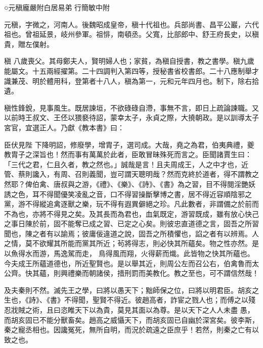 
\begin{pinyinscope}

 ○元稹龐嚴附白居易弟
 行簡敏中附



 元稹，字微之，河南人。後魏昭成皇帝，稹十代祖也。兵部尚書、昌平公巖，六代祖也。曾祖延景，岐州參軍。祖悱，南頓丞。父寬，比部郎中、舒王府長史，以稹貴，贈左僕射。



 稹
 八歲喪父。其母鄭夫人，賢明婦人也；家貧，為稹自授書，教之書學。稹九歲能屬文。十五兩經擢第。二十四調判入第四等，授秘書省校書郎。二十八應制舉才識兼茂、明於體用科，登第者十八人，稹為第一，元和元年四月也。制下，除右拾遺。



 稹性鋒銳，見事風生。既居諫垣，不欲碌碌自滯，事無不言，即日上疏論諫職。又以前時王叔文、王伾以猥褻待詔，蒙幸太子，永貞之際，大撓朝政。是以訓導太子宮官，宜選正人。乃獻《教本書》曰：



 臣伏見陛
 下降明詔，修廢學，增胄子，選司成。大哉，堯之為君，伯夷典禮，夔教胄子之深旨也！然而事有萬萬於此者，臣敢冒昧殊死而言之。臣聞諸賈生曰：「三代之君，仁且久者，教之然也。」誠哉是言！且夫周成王，人之中才也，近管、蔡則讒入，有周、召則義聞，豈可謂天聰明哉？然而克終於道者，得不謂教之然耶？俾伯禽、唐叔與之游，《禮》、《樂》、《詩》、《書》為之習，目不得閱淫艷妖誘之色，耳不得聞優笑凌亂之音，口不得習操斷擊博之書，居不得近容順陰邪之
 黨，游不得縱追禽逐獸之樂，玩不得有遐異僻絕之珍。凡此數者，非謂備之於前而不為也，亦將不得見之矣。及其長而為君也，血氣既定，游習既成，雖有放心快己之事日陳於前，固不能奪已成之習、已定之心矣。則彼忠直道德之言，固吾之所習聞也，陳之者有以諭焉；彼庸佞違道之說，固吾之所積懼也，諂之者有以辨焉。人之情，莫不欲耀其所能而黨其所近；茍將得志，則必快其所蘊矣。物之性亦然。是以魚得水而游，馬逸駕而走，
 鳥得風而翔，火得薪而熾。此皆物之快其所蘊也。今夫成王所蘊道德也，所近聖賢也。是以舉其近，則周公左而召公右，伯禽魯而太公齊。快其蘊，則興禮樂而朝諸侯，措刑罰而美教化。教之至也，可不謂信然哉！



 及夫秦則不然。滅先王之學，曰將以愚天下；黜師保之位，曰將以明君臣。胡亥之生也，《詩》、《書》不得聞，聖賢不得近。彼趙高者，詐宦之戮人也；而傅之以殘忍戕賊之術，且曰恣睢天下以為貴，莫見其面以為尊。是以天下之人人未盡
 愚，而胡亥固已不能分獸畜矣。趙高之威懾天下，而胡亥固已自幽於深宮矣。彼李斯，秦之寵丞相也。因讒冤死，無所自明，而況於疏遠之臣庶乎！若然，則秦之亡有以致之也。




\end{pinyinscope}
